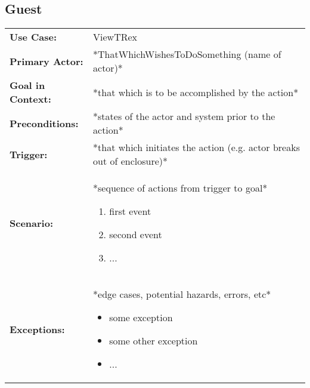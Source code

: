 \documentclass[12pt]{article}
\begin{document}
    \subsection{Guest}
    \begin{table}[H]
    \begin{tabular}{lp{9.9cm}}
        \hline
        \textbf{Use Case:}                     & ViewTRex \\

        \textbf{Primary Actor:}                & *ThatWhichWishesToDoSomething (name of actor)*\\

        \textbf{Goal in Context:}              & *that which is to be accomplished by the action* \\

        \textbf{Preconditions:}                & *states of the actor and system prior to the action* \\

        \textbf{Trigger:}                      & *that which initiates the action (e.g. actor breaks out of enclosure)*\\

        \textbf{Scenario:}                     & *sequence of actions from trigger to goal*
                                                 \begin{enumerate}
                                                     \item first event
                                                     \item second event
                                                     \item ...
                                                 \end{enumerate} \\

        \textbf{Exceptions:}                   & *edge cases, potential hazards, errors, etc*
                                                 \begin{itemize}
                                                     \item[] some exception
                                                     \item[] some other exception
                                                     \item[] ...
                                                 \end{itemize}\\


\end{tabular}
\end{table}
\end{document}
